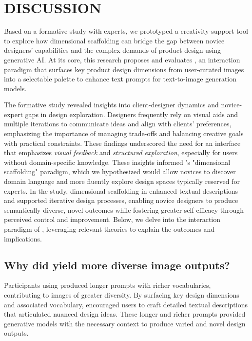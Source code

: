 \section{DISCUSSION}
Based on a formative study with experts, we prototyped a creativity-support tool to explore how dimensional scaffolding can bridge the gap between novice designers’ capabilities and the complex demands of product design using generative AI. At its core, this research proposes and evaluates \toolname{}, an interaction paradigm that surfaces key product design dimensions from user-curated images into a selectable palette to enhance text prompts for text-to-image generation models.

The formative study revealed insights into client-designer dynamics and novice-expert gaps in design exploration. Designers frequently rely on visual aids and multiple iterations to communicate ideas and align with clients’ preferences, emphasizing the importance of managing trade-offs and balancing creative goals with practical constraints. These findings underscored the need for an interface that emphasizes \textit{visual feedback} and \textit{structured exploration}, especially for users without domain-specific knowledge. These insights informed \toolname{} ’s "dimensional scaffolding" paradigm, which we hypothesized would allow novices to discover domain language and more fluently explore design spaces typically reserved for experts. In the study, dimensional scaffolding in \toolname{} enhanced textual descriptions and supported iterative design processes, enabling novice designers to produce semantically diverse, novel outcomes while fostering greater self-efficacy through perceived control and improvement. Below, we delve into the interaction paradigm of \toolname{}, leveraging relevant theories to explain the outcomes and implications.

\subsection{Why did \toolname{} yield more diverse image outputs?}
Participants using \toolname{} produced longer prompts with richer vocabularies, contributing to images of greater diversity. By surfacing key design dimensions and associated vocabulary, \toolname{} encouraged users to craft detailed textual descriptions that articulated nuanced design ideas. These longer and richer prompts provided generative models with the necessary context to produce varied and novel design outputs.

